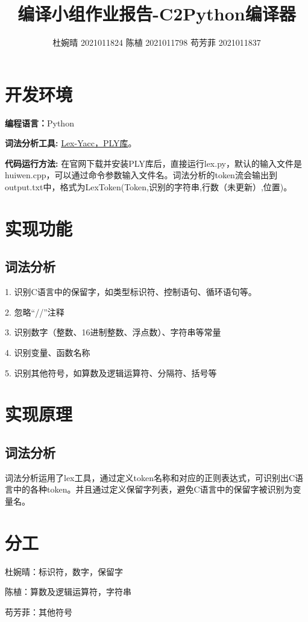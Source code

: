 \documentclass{article}
\begin{document}
\title{\textbf{编译小组作业报告-C2Python编译器}}
\author{杜婉晴 2021011824 陈植 2021011798 苟芳菲 2021011837}
\maketitle \thispagestyle{empty}
\section{开发环境}

\textbf{编程语言：}Python

\textbf{词法分析工具: }
\href{https://tastones.com/stackoverflow/python-language/python-lex-yacc/getting_started_with_ply/}{Lex-Yacc，PLY库}。

\textbf{代码运行方法: }在官网下载并安装PLY库后，直接运行lex.py，默认的输入文件是huiwen.cpp，可以通过命令参数输入文件名。词法分析的token流会输出到output.txt中，格式为LexToken(Token,识别的字符串,行数（未更新）,位置)。

\section{实现功能}
\subsection{词法分析}
1. 识别C语言中的保留字，如类型标识符、控制语句、循环语句等。

2. 忽略“//”注释

3. 识别数字（整数、16进制整数、浮点数）、字符串等常量

4. 识别变量、函数名称

5. 识别其他符号，如算数及逻辑运算符、分隔符、括号等

\section{实现原理}
\subsection{词法分析}
词法分析运用了lex工具，通过定义token名称和对应的正则表达式，可识别出C语言中的各种token。并且通过定义保留字列表，避免C语言中的保留字被识别为变量名。

\section{分工}
杜婉晴：标识符，数字，保留字

陈植：算数及逻辑运算符，字符串

苟芳菲：其他符号
\end{document}
